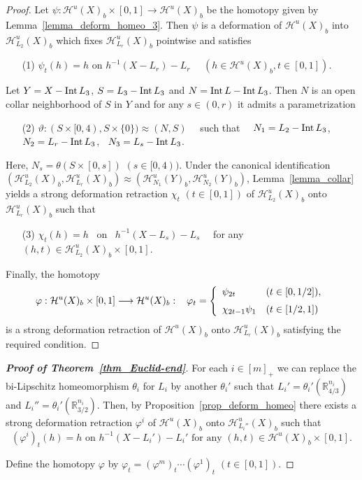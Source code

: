\documentclass[11pt, fleqn]{amsart}
\theoremstyle{definition}
\newcommand{\cal}{\mathcal}
\renewcommand{\phi}{\varphi}
\newcommand{\lra}{\longrightarrow}
\newcommand{\IR}{\mathbb R}
\begin{document}
\begin{proof}  
Let $\psi : {\cal H}^u(X)_b \times [0,1] \lra {\cal H}^u(X)_b$ be the homotopy given by Lemma~\ref{lemma_deform_homeo_3}. 
Then $\psi$ is a deformation of ${\cal H}^u(X)_b$ into ${\cal H}^u_{L_2}(X)_b$ which fixes ${\cal H}^u_{L_r}(X)_b$ pointwise and 
satisfies 
\begin{itemize}
\item[(1)] $\psi_t(h) = h$ on $h^{-1}(X - L_r) - L_r$ \ \ $(h \in {\cal H}^u(X)_b, t \in [0,1])$.  
\end{itemize} 

Let $Y = X - {\rm Int}\,L_3$, $S = L_3 - {\rm Int}\,L_3$ and $N = {\rm Int}\,L - {\rm Int}\,L_3$. 
Then $N$ is an open collar neighborhood of $S$ in $Y$ and 
for any $s \in (0, r)$ it admits a parametrization 
\begin{itemize}
\item[(2)] $\vartheta : (S \times [0,4), S \times \{ 0 \}) \approx (N, S)$ \ \ such that \ \  
$N_1 = L_2 - {\rm Int}\,L_3$, \ 
$N_2 = L_r - {\rm Int}\,L_3$, \ 
$N_3 = L_s - {\rm Int}\,L_3$. 
\end{itemize} 
Here, $N_s = \theta(S \times [0,s])$ $(s \in [0,4))$. 
Under the canonical identification $({\cal H}^u_{L_2}(X)_b, {\cal H}^u_{L_r}(X)_b) \approx ({\cal H}^u_{N_1}(Y)_b, {\cal H}^u_{N_2}(Y)_b)$, 
Lemma~\ref{lemma_collar} yields a strong deformation retraction 
$\chi_t$ $(t \in [0,1])$ of ${\cal H}^u_{L_2}(X)_b$ onto ${\cal H}^u_{L_r}(X)_b$ such that 
\begin{itemize}
\item[(3)] $\chi_t(h) = h$ \ on \ $h^{-1}(X - L_s) - L_s$ \ \ for any \ $(h,t ) \in {\cal H}^u_{L_2}(X)_b \times [0,1]$.
\end{itemize} 

Finally, the homotopy $$\phi : {\cal H}^u(X)_b \times [0,1] \lra {\cal H}^u(X)_b : \hspace{3mm} 
\phi_t = 
\left\{\begin{array}[c]{ll}
\psi_{2t} & (t \in [0,1/2]), \\[2mm] 
\chi_{2t-1} \psi_1 & (t \in [1/2,1]) 
\end{array}\right.$$ 
\vskip 2mm 
\noindent is a strong deformation retraction of ${\cal H}^u(X)_b$ onto ${\cal H}^u_{L_r}(X)_b$ satisfying the required condition. 
\end{proof}

\begin{proof}[\bf Proof of Theorem~\ref{thm_Euclid-end}] 
For each $i \in [m]_+$ we can replace the bi-Lipschitz homeomorphism $\theta_i$ for $L_i$ by another $\theta_i'$ such that $L_i' = \theta_i'(\IR^{n_i}_{4/3})$ and $L_i'' = \theta_i'(\IR^{n_i}_{3/2})$. 
Then, by Proposition~\ref{prop_deform_homeo} 
there exists a strong deformation retraction $\phi^i$ of ${\cal H}^u(X)_b$ onto ${\cal H}^u_{L_i''}(X)_b$ such that 
$$\mbox{$(\phi^i)_t(h) = h$ \ on \ $h^{-1}(X - L_i') - L_i'$ \ \ for any \ $(h,t) \in {\cal H}^u(X)_b \times [0,1]$.}$$  

Define the homotopy $\phi$ by $\phi_t = (\phi^m)_t \cdots (\phi^1)_t$ $(t \in [0,1])$. 
\end{proof}
\end{document}
